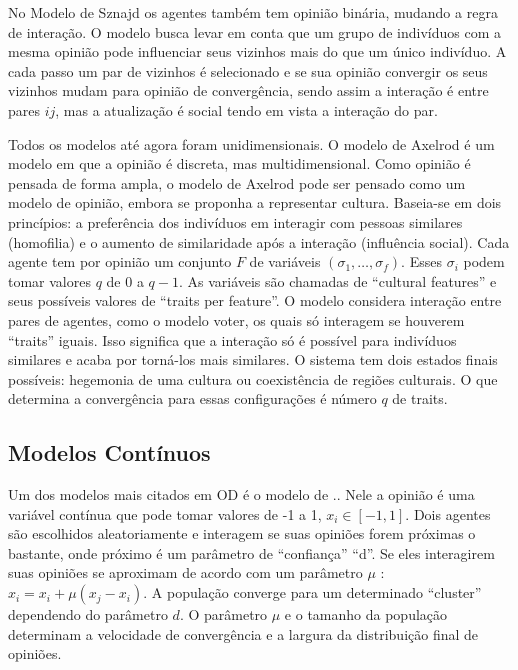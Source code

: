 No Modelo de Sznajd os agentes também tem opinião binária, mudando a regra de
interação. O modelo busca levar em conta que um grupo de indivíduos com a mesma
opinião pode influenciar seus vizinhos mais do que um único indivíduo. A cada
passo um par de vizinhos é selecionado e se sua opinião convergir os seus
vizinhos mudam para opinião de convergência, sendo assim a interação é entre
pares $ij$, mas a atualização é social tendo em vista a interação do par.


Todos os modelos até agora foram unidimensionais. O modelo de Axelrod é um
modelo em que a opinião é discreta, mas multidimensional. Como opinião é pensada
de forma ampla, o modelo de Axelrod pode ser pensado como um modelo de opinião,
embora se proponha a representar cultura. Baseia-se em dois princípios: a
preferência dos indivíduos em interagir com pessoas similares (homofilia) e o
aumento de similaridade após a interação (influência social). Cada agente tem
por opinião um conjunto $F$ de variáveis $(\sigma_1 , \ldots, \sigma_f)$. Esses $\sigma_i$ podem
tomar valores $q$ de 0 a $q-1$. As variáveis são chamadas de ``cultural
features'' e seus possíveis valores de ``traits per feature''. O modelo
considera interação entre pares de agentes, como o modelo voter, os quais só
interagem se houverem ``traits'' iguais. Isso significa que a interação só é
possível para indivíduos similares e acaba por torná-los mais similares. O
sistema tem dois estados finais possíveis: hegemonia de uma cultura ou
coexistência de regiões culturais. O que determina a convergência para essas
configurações é número $q$ de traits.



\subsection{Modelos Contínuos}



\quad \quad Um dos modelos mais citados em OD é o modelo de
..
Nele a opinião é uma variável contínua que pode tomar valores de -1 a 1, $x_i \in
[-1,1]$. Dois agentes são escolhidos aleatoriamente e interagem se suas opiniões
forem próximas o bastante, onde próximo é um parâmetro de ``confiança'' ``d''.
Se eles interagirem suas opiniões se aproximam de acordo com um parâmetro $\mu$ :
$x_i = x_i + \mu(x_j - x_i)$. A população converge para um determinado ``cluster''
dependendo do parâmetro $d$. O parâmetro $\mu$ e o tamanho da população determinam
a velocidade de convergência e a largura da distribuição final de opiniões.

